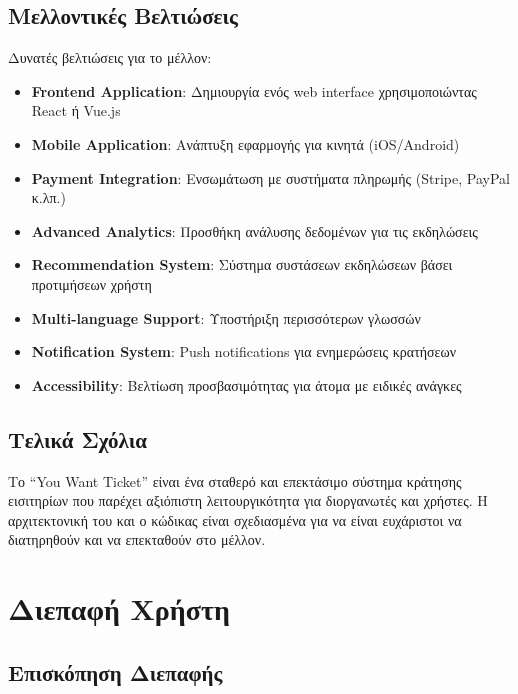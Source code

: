 \documentclass[12pt,a4paper]{report}
\begin{document}
\section{Μελλοντικές Βελτιώσεις}

Δυνατές βελτιώσεις για το μέλλον:

\begin{itemize}
    \item \textbf{Frontend Application}: Δημιουργία ενός web interface χρησιμοποιώντας React ή Vue.js
    \item \textbf{Mobile Application}: Ανάπτυξη εφαρμογής για κινητά (iOS/Android)
    \item \textbf{Payment Integration}: Ενσωμάτωση με συστήματα πληρωμής (Stripe, PayPal κ.λπ.)
    \item \textbf{Advanced Analytics}: Προσθήκη ανάλυσης δεδομένων για τις εκδηλώσεις
    \item \textbf{Recommendation System}: Σύστημα συστάσεων εκδηλώσεων βάσει προτιμήσεων χρήστη
    \item \textbf{Multi-language Support}: Υποστήριξη περισσότερων γλωσσών
    \item \textbf{Notification System}: Push notifications για ενημερώσεις κρατήσεων
    \item \textbf{Accessibility}: Βελτίωση προσβασιμότητας για άτομα με ειδικές ανάγκες
\end{itemize}

\section{Τελικά Σχόλια}

Το ``You Want Ticket'' είναι ένα σταθερό και επεκτάσιμο σύστημα κράτησης εισιτηρίων που παρέχει αξιόπιστη λειτουργικότητα για διοργανωτές και χρήστες. Η αρχιτεκτονική του και ο κώδικας είναι σχεδιασμένα για να είναι ευχάριστοι να διατηρηθούν και να επεκταθούν στο μέλλον.

\newpage

\chapter{Διεπαφή Χρήστη}

\section{Επισκόπηση Διεπαφής}
\end{document}
